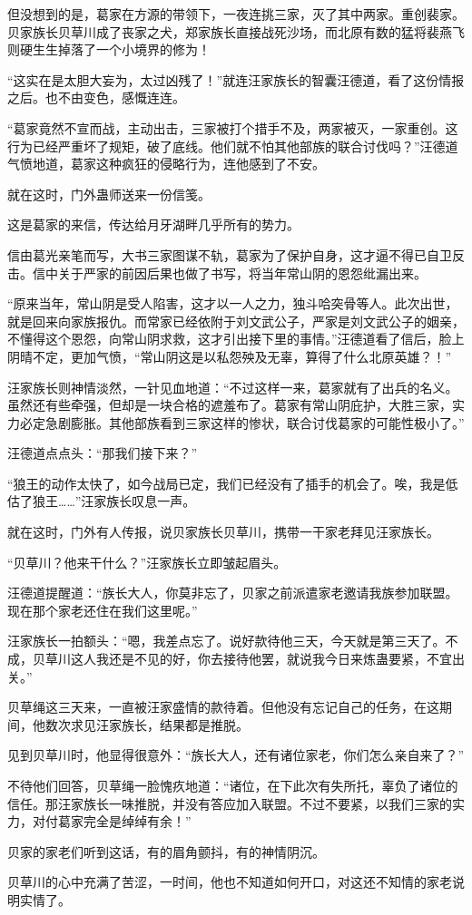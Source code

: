 \begin{this_body}
但没想到的是，葛家在方源的带领下，一夜连挑三家，灭了其中两家。重创裴家。贝家族长贝草川成了丧家之犬，郑家族长直接战死沙场，而北原有数的猛将裴燕飞则硬生生掉落了一个小境界的修为！

“这实在是太胆大妄为，太过凶残了！”就连汪家族长的智囊汪德道，看了这份情报之后。也不由变色，感慨连连。

“葛家竟然不宣而战，主动出击，三家被打个措手不及，两家被灭，一家重创。这行为已经严重坏了规矩，破了底线。他们就不怕其他部族的联合讨伐吗？”汪德道气愤地道，葛家这种疯狂的侵略行为，连他感到了不安。

就在这时，门外蛊师送来一份信笺。

这是葛家的来信，传达给月牙湖畔几乎所有的势力。

信由葛光亲笔而写，大书三家图谋不轨，葛家为了保护自身，这才逼不得已自卫反击。信中关于严家的前因后果也做了书写，将当年常山阴的恩怨纰漏出来。

“原来当年，常山阴是受人陷害，这才以一人之力，独斗哈突骨等人。此次出世，就是回来向家族报仇。而常家已经依附于刘文武公子，严家是刘文武公子的姻亲，不懂得这个恩怨，向常山阴求救，这才引出接下里的事情。”汪德道看了信后，脸上阴晴不定，更加气愤，“常山阴这是以私怨殃及无辜，算得了什么北原英雄？！”

汪家族长则神情淡然，一针见血地道：“不过这样一来，葛家就有了出兵的名义。虽然还有些牵强，但却是一块合格的遮羞布了。葛家有常山阴庇护，大胜三家，实力必定急剧膨胀。其他部族看到三家这样的惨状，联合讨伐葛家的可能性极小了。”

汪德道点点头：“那我们接下来？”

“狼王的动作太快了，如今战局已定，我们已经没有了插手的机会了。唉，我是低估了狼王……”汪家族长叹息一声。

就在这时，门外有人传报，说贝家族长贝草川，携带一干家老拜见汪家族长。

“贝草川？他来干什么？”汪家族长立即皱起眉头。

汪德道提醒道：“族长大人，你莫非忘了，贝家之前派遣家老邀请我族参加联盟。现在那个家老还住在我们这里呢。”

汪家族长一拍额头：“嗯，我差点忘了。说好款待他三天，今天就是第三天了。不成，贝草川这人我还是不见的好，你去接待他罢，就说我今日来炼蛊要紧，不宜出关。”

贝草绳这三天来，一直被汪家盛情的款待着。但他没有忘记自己的任务，在这期间，他数次求见汪家族长，结果都是推脱。

见到贝草川时，他显得很意外：“族长大人，还有诸位家老，你们怎么亲自来了？”

不待他们回答，贝草绳一脸愧疚地道：“诸位，在下此次有失所托，辜负了诸位的信任。那汪家族长一味推脱，并没有答应加入联盟。不过不要紧，以我们三家的实力，对付葛家完全是绰绰有余！”

贝家的家老们听到这话，有的眉角颤抖，有的神情阴沉。

贝草川的心中充满了苦涩，一时间，他也不知道如何开口，对这还不知情的家老说明实情了。

\end{this_body}

